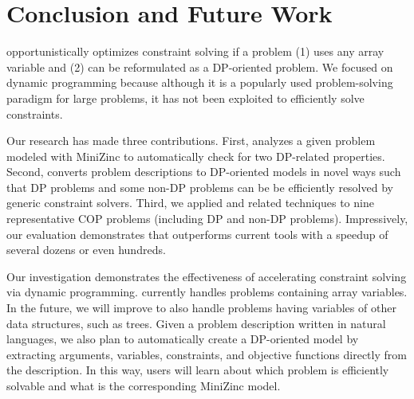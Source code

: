 \section{Conclusion and Future Work}

\tool opportunistically optimizes constraint solving if a problem (1) uses any array variable and (2) can be reformulated as a DP-oriented problem. We focused on dynamic programming because although it is a popularly used problem-solving paradigm for large problems, it has not been exploited to efficiently solve constraints. 

Our research has made three contributions. First, \tool analyzes a given problem modeled with MiniZinc to automatically check for two DP-related properties. Second, \tool converts problem descriptions to DP-oriented models in novel ways such that DP problems and some non-DP problems can be be efficiently resolved by generic constraint solvers. 
Third, we applied \tool and related techniques to nine representative COP problems (including DP and non-DP problems). Impressively, our evaluation demonstrates that \tool outperforms current tools with a speedup of several dozens or even hundreds.  

Our investigation demonstrates the effectiveness of accelerating constraint solving via dynamic programming. \tool currently handles problems containing array variables. In the future, we will improve \tool to also handle problems having variables of other data structures, such as trees. 
Given a problem description written in natural languages, we also plan to automatically create a DP-oriented model by extracting arguments, variables, constraints, and objective functions directly from the description. In this way, users will learn about which problem is efficiently solvable and what is the corresponding MiniZinc model. 


